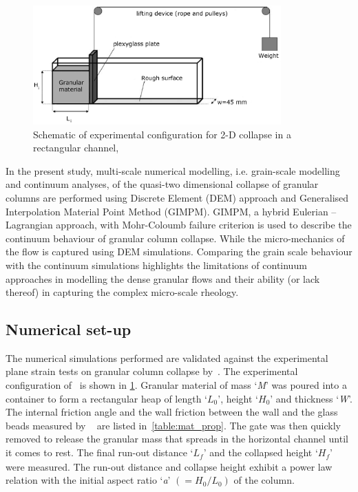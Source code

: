 \begin{figure}[tbhp]
\centering
\includegraphics[width=0.85\textwidth]{experiment_setup}
\caption{Schematic of experimental configuration for 2-D collapse in a 
rectangular channel,~\citep{Lajeunesse2004}}
\label{fig:exp}
\end{figure}

In the present study, multi-scale numerical modelling, i.e. grain-scale 
modelling and continuum analyses, of the quasi-two dimensional collapse of 
granular columns are performed using Discrete Element (DEM) approach and 
Generalised Interpolation Material Point Method (GIMPM). GIMPM, a hybrid 
Eulerian -- Lagrangian approach, with Mohr-Coloumb failure criterion is used to 
describe the continuum behaviour of granular column collapse. While the 
micro-mechanics of the flow is captured using DEM simulations. Comparing the 
grain scale behaviour with the continuum simulations highlights the limitations 
of continuum approaches in modelling the dense granular flows and their ability 
(or lack thereof) in capturing the complex micro-scale rheology.

\subsection{Numerical set-up}

The numerical simulations performed are validated against 
the experimental plane strain tests on granular column collapse 
by~\citet{Lajeunesse2004}. The experimental configuration 
of~\citet{Lajeunesse2004} is shown in \cref{fig:exp}. Granular material of mass 
`\textit{M}' was poured into a container to form a rectangular heap of length 
`${L}_{\textit{0}}$', height `${H}_{\textit{0}}$' and thickness `\textit{W}'. 
The internal friction angle and the wall friction between the wall and the 
glass beads measured by ~\citet{Lajeunesse2004} are listed 
in~\cref{table:mat_prop}. The gate was then quickly removed to 
release the granular mass that spreads in the horizontal channel until it comes 
to rest. The final run-out distance `${L}_{\textit{f}}$' and the collapsed 
height `$H_{\textit{f}}$' were measured. The run-out distance and collapse 
height exhibit a power law relation with the initial aspect ratio 
`\textit{a}' $(=H_{\textit{0}}/L_{\textit{0}})$ of the column. 

